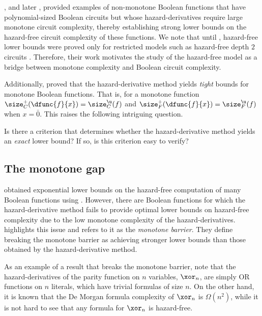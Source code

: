 \documentclass[acmsmall, nonacm, authorversion]{acmart}
\begin{document}
\cite{IKL+19}, and later \cite{Juk21}, provided examples of non-monotone Boolean functions that have polynomial-sized Boolean circuits but whose hazard-derivatives require large monotone circuit complexity, thereby establishing strong lower bounds on the hazard-free circuit complexity of these functions. We note that until \cite{IKL+19}, hazard-free lower bounds were proved only for restricted models such as hazard-free depth $2$ circuits \cite{Eic65, ND95}. Therefore, their work motivates the study of the hazard-free model as a bridge between monotone complexity and Boolean circuit complexity.

Additionally, \cite[Theorem 1.3]{IKL+19} proved that the hazard-derivative method yields \emph{tight} bounds for monotone Boolean functions. That is, for a monotone function $\size_{C}^{+}(\dfunc{f}{x})=\size_{C}^{\u}(f)$ and $\size_{F}^{+}(\dfunc{f}{x})=\size_{F}^{\u}(f)$ when $x=\bar{0}$. This raises the following intriguing question.

\begin{question}\label{que:monotone-gap-criterion}
Is there a criterion that determines whether the hazard-derivative method yields an \emph{exact} lower bound? If so, is this criterion easy to verify?
\end{question}

\subsection{The monotone gap} 
\cite{IKL+19, Juk21} obtained exponential lower bounds on the hazard-free computation of many Boolean functions using . However, there are Boolean functions for which the hazard-derivative method fails to provide optimal lower bounds on hazard-free complexity due to the low monotone complexity of the hazard-derivatives. \cite{IK23} highlights this issue and refers to it as the \emph{monotone barrier}. They define breaking the monotone barrier as achieving stronger lower bounds than those obtained by the hazard-derivative method. 

As an example of a result that breaks the monotone barrier, \cite{IK23} note that the hazard-derivatives of the parity function on $n$ variables, $\xor_n$, are simply OR functions on $n$ literals, which have trivial formulas of size $n$. On the other hand, it is known that the De Morgan formula complexity of $\xor_n$ is $\Omega(n^2)$, while it is not hard to see that any formula for $\xor_n$ is hazard-free.
\end{document}

